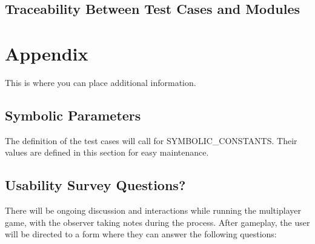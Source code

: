 \documentclass[12pt, titlepage]{article}
\begin{document}
\subsection{Traceability Between Test Cases and Modules}

				




\newpage

\section{Appendix}

This is where you can place additional information.

\subsection{Symbolic Parameters}

The definition of the test cases will call for SYMBOLIC\_CONSTANTS.
Their values are defined in this section for easy maintenance.

\subsection{Usability Survey Questions?}

There will be ongoing discussion and interactions while running the multiplayer game, with the observer taking notes during the process. After gameplay, the user will be directed to a form where they can answer the following questions:
\end{document}
